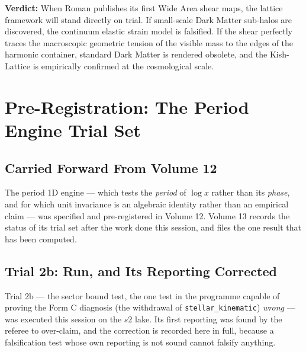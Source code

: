 \documentclass[11pt, letterpaper, openany]{book}
\begin{document}
\textbf{Verdict:} When Roman publishes its first Wide Area shear maps, the lattice framework will stand directly on trial. If small-scale Dark Matter sub-halos are discovered, the continuum elastic strain model is falsified. If the shear perfectly traces the macroscopic geometric tension of the visible mass to the edges of the harmonic container, standard Dark Matter is rendered obsolete, and the Kish-Lattice is empirically confirmed at the cosmological scale.

\chapter{Pre-Registration: The Period Engine Trial Set}

\section{Carried Forward From Volume 12}

The period 1D engine --- which tests the \emph{period} of $\log x$ rather than its \emph{phase},
and for which unit invariance is an algebraic identity rather than an empirical claim --- was
specified and pre-registered in Volume 12. Volume 13 records the status of its trial set after
the work done this session, and files the one result that has been computed.

\section{Trial 2b: Run, and Its Reporting Corrected}

Trial 2b --- the sector bound test, the one test in the programme capable of proving the Form C
diagnosis (the withdrawal of \texttt{stellar\_kinematic}) \emph{wrong} --- was executed this
session on the $s2$ lake. Its first reporting was found by the referee to over-claim, and the
correction is recorded here in full, because a falsification test whose own reporting is not
sound cannot falsify anything.
\end{document}
